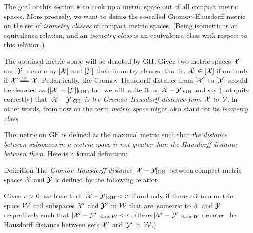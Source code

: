 The goal of this section is to cook up a metric space out of all compact metric spaces.
More precisely, we want to define the so-called  Gromov--Hausdorff metric on the set of \textit{isometry classes} of compact metric spaces.
(Being isometric is an equivalence relation, 
and an \emph{isometry class} is an equivalence class with respect to this relation.)

The obtained metric space will be denoted by $\operatorname{\rm GH}\nolimits$.
Given two metric spaces $\mathcal{X}$ and $\mathcal{Y}$,
denote by $[\mathcal{X}]$ and $[\mathcal{Y}]$ their isometry classes;
that is, $\mathcal{X}'\in [\mathcal{X}]$ if and only if $\spc{X}'\iso \spc{X}$.
Pedantically, the Gromov--Hausdorff distance from $[\mathcal{X}]$ 
to $[\mathcal{Y}]$ should be denoted as $|[\mathcal{X}]-[\mathcal{Y}]|_{\operatorname{\rm GH}\nolimits}$;
but we will write it as $|\spc{X}\z-\spc{Y}|_{\GH}$ and say (not quite correctly) that 
\textit{$|\spc{X}\z-\spc{Y}|_{\GH}$ is the Gromov--Hausdorff distance from  $\mathcal{X}$ 
to  $\mathcal{Y}$}.
In other words, from now on the term \textit{metric space} might also stand for its \textit{isometry class}.

The metric on $\operatorname{\rm GH}\nolimits$ is defined as the maximal metric such that \textit{the distance between subspaces in a metric space is not greater than the Hausdorff distance between them}.
Here is a formal definition:

\begin{thm}{Definition}\label{def:GH}
The \emph{Gromov--Hausdorff distance} $|\mathcal{X}-\mathcal{Y}|_{\operatorname{\rm GH}\nolimits}$ between compact metric spaces $\mathcal{X}$ and $\mathcal{Y}$
is defined by the following
relation.
 
Given  $r > 0$, we have that $|\mathcal{X}-\mathcal{Y}|_{\operatorname{\rm GH}\nolimits} < r$ if and only if there exists a metric
space $\mathcal{W}$ and subspaces $\mathcal{X}'$ and $\mathcal{Y}'$ in $\mathcal{W}$ that are isometric to $\mathcal{X}$ and $\mathcal{Y}$
respectively such that $|\mathcal{X}'-\mathcal{Y}'|_{\operatorname{\rm Haus}\nolimits\mathcal{W}} < r$. 
(Here $|\mathcal{X}'-\mathcal{Y}'|_{\operatorname{\rm Haus}\nolimits\mathcal{W}}$ denotes the Hausdorff distance between sets $\mathcal{X}'$ and $\mathcal{Y}'$ in $\mathcal{W}$.)
\end{thm}

